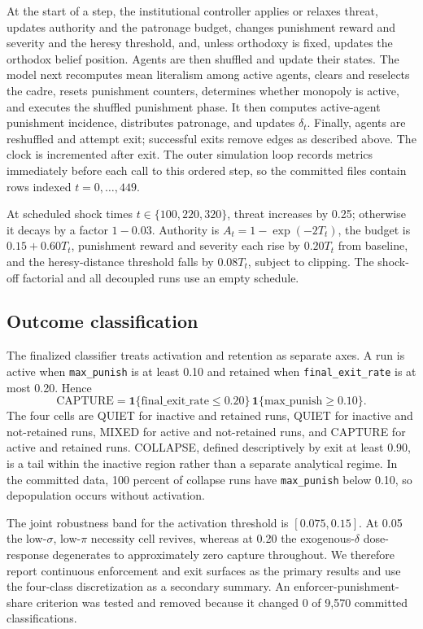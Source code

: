 At the start of a step, the institutional controller applies or relaxes threat, updates authority and the patronage budget, changes punishment reward and severity and the heresy threshold, and, unless orthodoxy is fixed, updates the orthodox belief position. Agents are then shuffled and update their states. The model next recomputes mean literalism among active agents, clears and reselects the cadre, resets punishment counters, determines whether monopoly is active, and executes the shuffled punishment phase. It then computes active-agent punishment incidence, distributes patronage, and updates \(\delta_t\). Finally, agents are reshuffled and attempt exit; successful exits remove edges as described above. The clock is incremented after exit. The outer simulation loop records metrics immediately before each call to this ordered step, so the committed files contain rows indexed \(t=0,\ldots,449\).

At scheduled shock times \(t\in\{100,220,320\}\), threat increases by 0.25; otherwise it decays by a factor \(1-0.03\). Authority is \(A_t=1-\exp(-2T_t)\), the budget is \(0.15+0.60T_t\), punishment reward and severity each rise by \(0.20T_t\) from baseline, and the heresy-distance threshold falls by \(0.08T_t\), subject to clipping. The shock-off factorial and all decoupled runs use an empty schedule.

\subsection{Outcome classification}

The finalized classifier treats activation and retention as separate axes. A run is active when \texttt{max\_punish} is at least 0.10 and retained when \texttt{final\_exit\_rate} is at most 0.20. Hence
\begin{equation}
 \mathrm{CAPTURE}=\mathbf{1}\{\mathrm{final\_exit\_rate}\leq0.20\}\,\mathbf{1}\{\mathrm{max\_punish}\geq0.10\}.
\end{equation}
The four cells are QUIET for inactive and retained runs, QUIET for inactive and not-retained runs, MIXED for active and not-retained runs, and CAPTURE for active and retained runs. COLLAPSE, defined descriptively by exit at least 0.90, is a tail within the inactive region rather than a separate analytical regime. In the committed data, 100 percent of collapse runs have \texttt{max\_punish} below 0.10, so depopulation occurs without activation.

The joint robustness band for the activation threshold is \([0.075,0.15]\). At 0.05 the low-\(\sigma\), low-\(\pi\) necessity cell revives, whereas at 0.20 the exogenous-\(\delta\) dose-response degenerates to approximately zero capture throughout. We therefore report continuous enforcement and exit surfaces as the primary results and use the four-class discretization as a secondary summary. An enforcer-punishment-share criterion was tested and removed because it changed 0 of 9,570 committed classifications.

